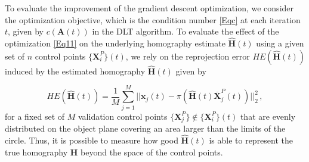 \documentclass[letterpaper, 10 pt, conference]{ieeeconf}  %
\begin{document}
	
	To evaluate the improvement of the gradient descent optimization, 
	we consider the optimization objective, which is the
	condition number \eqref{Eqc} at each iteration $t$, given by $c(\mathbf{A}(t))$ in the DLT algorithm.
	To evaluate the effect of the optimization \eqref{Eq11} on the underlying homography estimate 
	$\hat{\mathbf{H}}(t)$ using a given set of $n$ control points $\{\mathbf{X}^P_{i}\}(t)$,
	we rely on the reprojection error $HE(\hat{\mathbf{H}}(t))$ induced by the estimated homography $\hat{\mathbf{H}}(t)$ given by
	
	\begin{equation}
	HE\left(\hat{\mathbf{H}}(t)\right) = \frac{1}{M}
	\sum\limits_{j=1}^M |\!| \mathbf{x}_j(t) - \pi\left(\hat{\mathbf{H}}(t)\overline{\mathbf{X}}_j^{P}(t)\right)|\!|_2^2\,,
	\end{equation}
	for a fixed set of $M$ validation control points $\{\mathbf{X}_j^{P}\} \not\in \{\mathbf{X}^P_{i}\}(t)$
	that are evenly distributed on the object plane covering an area larger than the limits of the circle.   Thus, it is possible to measure how good $\hat{\mathbf{H}}(t)$ is able to represent the true homography $\mathbf{H}$ beyond the space of the control points.     
	
	
\end{document}
